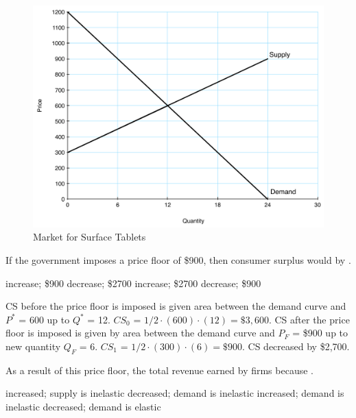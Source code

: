 \documentclass[addpoints,11pt]{exam}
\theoremstyle{definition}
\newcommand{\blank}[0]{\underline{\hspace{3cm}}}
\begin{document}
\begin{questions}

\begin{figure}[H]
	\centering
	\includegraphics[scale=.45]{hw3_plot1.pdf}
	\caption{Market for Surface Tablets}
	\label{fig2}
\end{figure}

\newpage
		
	\question \label{blah1} If the government imposes a price floor of \$900, then consumer surplus would \blank by \blank.
	
	\begin{choices}
		\choice increase; \$900
		\CorrectChoice decrease; \$2700
		\choice increase; \$2700
		\choice decrease; \$900
	\end{choices}
	
	\begin{solution}
		CS before the price floor is imposed is given area between the demand curve and $P^*$ = 600 up to $Q^*$ = 12. $CS_0$ = $1/2\cdot(600)\cdot(12) = \$3,600.$ CS after the price floor is imposed is given by area between the demand curve and $P_F$ = \$900 up to new quantity $Q_F$ = 6. $CS_1$ = $1/2 \cdot (300) \cdot (6) = \$900$. CS decreased by \$2,700.
	\end{solution}
	
	\question \label{blah2} As a result of this price floor, the total revenue earned by firms \blank because \blank.
	
	\begin{choices}
		\question increased; supply is inelastic 
		\question decreased; demand is inelastic
		\question increased; demand is inelastic
		\CorrectChoice decreased; demand is elastic
	\end{choices}
	

\end{questions}
\end{document}

